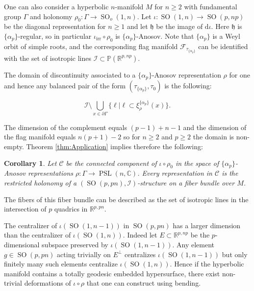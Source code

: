 \documentclass[reqno,10pt]{amsart}
\theoremstyle{plain}
\newtheorem{cor}[thm]{Corollary}
\theoremstyle{definition}
\theoremstyle{remark}
\newcommand{\type}{\tau}
\newcommand{\R}{\mathbb{R}}
\newcommand{\C}{\mathbb{C}}
\DeclareMathOperator{\PSL}{PSL}
\DeclareMathOperator{\SO}{SO}
\begin{document}


One can also consider a hyperbolic $n$-manifold $M$ for $n\geq 2$ with fundamental group $\Gamma$ and holonomy $\rho_0:\Gamma\to \SO_o(1,n)$. Let $\iota:\SO(1,n)\to \SO(p,np)$ be the diagonal representation for $n\geq 1$ and let $\mathfrak{h}$ be the image of $\mathrm{d}\iota$. Here $\mathfrak{h}$ is $\lbrace\alpha_p\rbrace$-regular, so in particular $\iota_\text{irr}\circ \rho_0$ is $\lbrace\alpha_p\rbrace$-Anosov. Note that $\lbrace\alpha_p\rbrace$ is a Weyl orbit of simple roots, and the corresponding flag manifold $\mathcal{F}_{\tau_{\lbrace\alpha_p\rbrace}}$ can be identified with the set of isotropic lines $\mathcal{I}\subset \mathbb{P}\left(\R^{p,np}\right)$.

\medskip

The domain of discontinuity associated to a $\lbrace \alpha_p\rbrace$-Anosov representation $\rho$ for one and hence any balanced pair of the form $(\type_{\lbrace \alpha_p\rbrace}, \type_0)$ is the following:

$$\mathcal{I}\setminus\bigcup_{x\in \partial \Gamma} \lbrace \ell|\ell\subset \xi_\rho^{\lbrace \alpha_p\rbrace}(x)\rbrace.$$

The dimension of the complement equals $(p-1)+n-1$ and the dimension of the flag manifold equals $n(p+1)-2$ so for $n\geq 2$ and $p\geq 2$ the domain is non-empty. Theorem \ref{thm:Application} implies therefore the following:

\begin{cor}
Let $\mathcal{C}$ be the connected component of $\iota\circ \rho_0$ in the space of $\lbrace\alpha_p\rbrace$-Anosov representations $\rho:\Gamma\to \PSL(n,\C)$. Every representation in $\mathcal{C}$ is the restricted holonomy of a $(\SO(p,pn),\mathcal{I})$-structure \emph{on a fiber bundle} over $M$.
\end{cor}

The fibers of this fiber bundle can be described as the set of isotropic lines in the intersection of $p$ quadrics in $\R^{p,pn}$.

\medskip

 The centralizer of $\iota\left(\SO(1,n-1)\right)$ in $\SO(p,pn)$ has a larger dimension than the centralizer of $\iota\left(\SO(1,n)\right)$. Indeed let $E\subset \R^{p,np}$ be the $p$-dimensional subspace preserved by $\iota\left(\SO(1,n-1)\right)$. Any element $g\in \SO(p,pn)$ acting trivially on $E^\perp$ centralizes $\iota\left(\SO(1,n-1)\right)$ but only finitely many such elements centralize $\iota\left(\SO(1,n)\right)$. Hence if the hyperbolic manifold contains a totally geodesic embedded hypersurface, there exist non-trivial deformations of $\iota\circ \rho$ that one can construct using bending.
\end{document}
